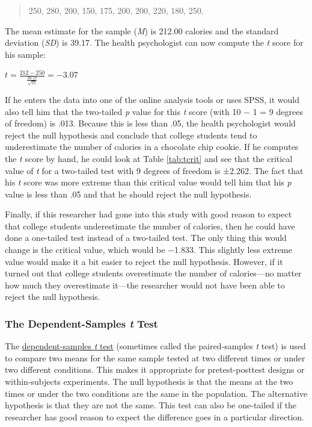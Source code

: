 \documentclass[
]{krantz}
\begin{document}
\begin{quote}
250, 280, 200, 150, 175, 200, 200, 220, 180, 250.
\end{quote}

The mean estimate for the sample (\emph{M}) is 212.00 calories and the standard deviation (\emph{SD}) is 39.17. The health psychologist can now compute the \emph{t} score for his sample:

\(t=\frac{212-250}{\frac{39.17}{\sqrt{10}}}=-3.07\)

If he enters the data into one of the online analysis tools or uses SPSS, it would also tell him that the two-tailed \emph{p} value for this \emph{t} score (with 10 − 1 = 9 degrees of freedom) is .013. Because this is less than .05, the health psychologist would reject the null hypothesis and conclude that college students tend to underestimate the number of calories in a chocolate chip cookie. If he computes the \emph{t} score by hand, he could look at Table \ref{tab:tcrit} and see that the critical value of \emph{t} for a two-tailed test with 9 degrees of freedom is ±2.262. The fact that his \emph{t} score was more extreme than this critical value would tell him that his \emph{p} value is less than .05 and that he should reject the null hypothesis.

Finally, if this researcher had gone into this study with good reason to expect that college students underestimate the number of calories, then he could have done a one-tailed test instead of a two-tailed test. The only thing this would change is the critical value, which would be −1.833. This slightly less extreme value would make it a bit easier to reject the null hypothesis. However, if it turned out that college students overestimate the number of calories---no matter how much they overestimate it---the researcher would not have been able to reject the null hypothesis.

\subsubsection*{\texorpdfstring{The Dependent-Samples \emph{t} Test}{The Dependent-Samples t Test}}\label{the-dependent-samples-t-test}


The \hyperref[dependent-samples-t-test]{dependent-samples \emph{t} test} (sometimes called the paired-samples \emph{t} test) is used to compare two means for the same sample tested at two different times or under two different conditions. This makes it appropriate for pretest-posttest designs or within-subjects experiments. The null hypothesis is that the means at the two times or under the two conditions are the same in the population. The alternative hypothesis is that they are not the same. This test can also be one-tailed if the researcher has good reason to expect the difference goes in a particular direction.
\end{document}
